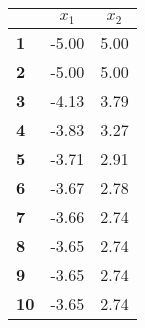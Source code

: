 \begin{small}\begin{tabular}{|l|c|c|}
\hline
&\textbf{$x_1$}&\textbf{$x_2$}\\\hline
\textbf{1}&-5.00&5.00\\\hline
\textbf{2}&-5.00&5.00\\\hline
\textbf{3}&-4.13&3.79\\\hline
\textbf{4}&-3.83&3.27\\\hline
\textbf{5}&-3.71&2.91\\\hline
\textbf{6}&-3.67&2.78\\\hline
\textbf{7}&-3.66&2.74\\\hline
\textbf{8}&-3.65&2.74\\\hline
\textbf{9}&-3.65&2.74\\\hline
\textbf{10}&-3.65&2.74\\\hline
\end{tabular}
\end{small}